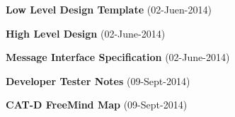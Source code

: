 {\bfseries Low Level Design Template} (02-\/\+Juen-\/2014)

{\bfseries High Level Design} (02-\/\+June-\/2014)

{\bfseries Message Interface Specification} (02-\/\+June-\/2014)

{\bfseries Developer Tester Notes} (09-\/\+Sept-\/2014)

{\bfseries C\+A\+T-\/\+D Free\+Mind Map} (09-\/\+Sept-\/2014) 